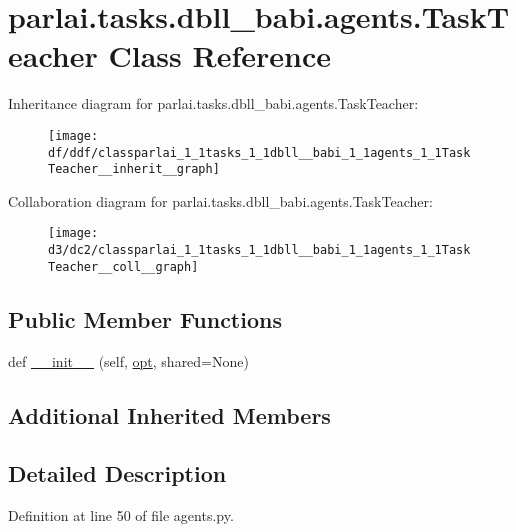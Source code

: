 \hypertarget{classparlai_1_1tasks_1_1dbll__babi_1_1agents_1_1TaskTeacher}{}\section{parlai.\+tasks.\+dbll\+\_\+babi.\+agents.\+Task\+Teacher Class Reference}
\label{classparlai_1_1tasks_1_1dbll__babi_1_1agents_1_1TaskTeacher}


Inheritance diagram for parlai.\+tasks.\+dbll\+\_\+babi.\+agents.\+Task\+Teacher\+:
\nopagebreak
\begin{figure}[H]
\begin{center}
\leavevmode
\texttt{[image: df/ddf/classparlai\_1\_1tasks\_1\_1dbll\_\_babi\_1\_1agents\_1\_1TaskTeacher\_\_inherit\_\_graph]}
\end{center}
\end{figure}


Collaboration diagram for parlai.\+tasks.\+dbll\+\_\+babi.\+agents.\+Task\+Teacher\+:
\nopagebreak
\begin{figure}[H]
\begin{center}
\leavevmode
\texttt{[image: d3/dc2/classparlai\_1\_1tasks\_1\_1dbll\_\_babi\_1\_1agents\_1\_1TaskTeacher\_\_coll\_\_graph]}
\end{center}
\end{figure}
\subsection*{Public Member Functions}
\begin{DoxyCompactItemize}
\item 
def \hyperlink{classparlai_1_1tasks_1_1dbll__babi_1_1agents_1_1TaskTeacher_a8e42d5b61c8f9eebccd45c467506077d}{\+\_\+\+\_\+init\+\_\+\+\_\+} (self, \hyperlink{classparlai_1_1core_1_1teachers_1_1FbDialogTeacher_af7a9ec497b9cd0292d7b8fa220da7c28}{opt}, shared=None)
\end{DoxyCompactItemize}
\subsection*{Additional Inherited Members}


\subsection{Detailed Description}


Definition at line 50 of file agents.\+py.



